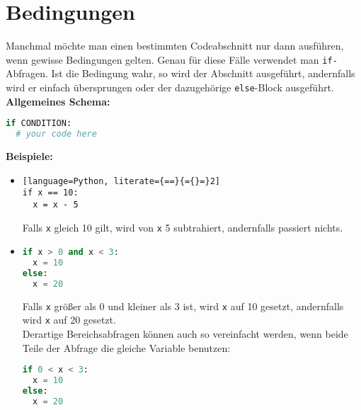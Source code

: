 \documentclass{article}
\begin{document}
	\section{Bedingungen}
	Manchmal möchte man einen bestimmten Codeabschnitt nur dann ausführen, wenn gewisse Bedingungen gelten. Genau für diese Fälle verwendet man \texttt{if-}Abfragen. Ist die Bedingung wahr, so wird der Abschnitt ausgeführt, andernfalls wird er einfach übersprungen oder der dazugehörige \texttt{else}-Block ausgeführt.\\
	\textbf{Allgemeines Schema:}
	\begin{lstlisting}[language=Python]
if CONDITION:
  # your code here
	\end{lstlisting}
	\textbf{Beispiele:}
	\begin{itemize}
		\item[] \begin{lstlisting}[language=Python, literate={==}{={}=}2]
if x == 10:
  x = x - 5
		\end{lstlisting}
		Falls \texttt{x} gleich 10 gilt, wird von \texttt{x} 5 subtrahiert, andernfalls passiert nichts.
		
		\item[] \begin{lstlisting}[language=Python]
if x > 0 and x < 3:
  x = 10
else:
  x = 20
		\end{lstlisting}
		Falls \texttt{x} größer als 0 und kleiner als 3 ist, wird \texttt{x} auf 10 gesetzt, andernfalls wird \texttt{x} auf 20 gesetzt.\\
		Derartige Bereichsabfragen können auch so vereinfacht werden, wenn beide Teile der Abfrage die gleiche Variable benutzen:
		\begin{lstlisting}[language=Python]
if 0 < x < 3:
  x = 10
else:
  x = 20
		\end{lstlisting}
	\end{itemize}
	
\end{document}
